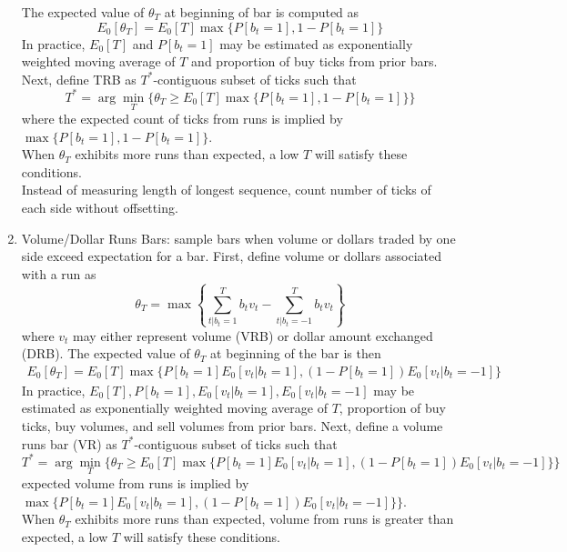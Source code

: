 \begin{remark}
\begin{enumerate}[label=\roman*.]
\begin{equation}
\end{equation}
The expected value of $\theta_T$ at beginning of bar is computed as
\begin{equation}
E_0[\theta_T] = E_0[T] \max \{P[b_t = 1], 1 - P[b_t = 1] \} \nonumber
\end{equation}
In practice, $E_0[T]$ and $P[b_t = 1]$ may be estimated as exponentially weighted moving average of $T$ and proportion of buy ticks from prior bars. Next, define TRB as $T^*$-contiguous subset of ticks such that
\begin{equation}
T^* = \arg \min_T \{ \theta_T \geq E_0[T] \max \{P[b_t = 1], 1 - P[b_t = 1] \} \} \nonumber
\end{equation}
where the expected count of ticks from runs is implied by $\max \{P[b_t = 1], 1 - P[b_t = 1] \}$.\\
When $\theta_T$ exhibits more runs than expected, a low $T$ will satisfy these conditions.\\
Instead of measuring length of longest sequence, count number of ticks of each side without offsetting.
\item Volume/Dollar Runs Bars: sample bars when volume or dollars traded by one side exceed expectation for a bar. First, define volume or dollars associated with a run as
\begin{equation}
\theta_T = \max \left\{ \sum\limits_{t \vert b_t = 1}^T b_t v_t - \sum\limits_{t \vert b_t = -1}^T b_t v_t \right\} \nonumber
\end{equation}
where $v_t$ may either represent volume (VRB) or dollar amount exchanged (DRB). The expected value of $\theta_T$ at beginning of the bar is then
\begin{align}
E_0 [\theta_T] = E_0[T] \max \{ P[b_t = 1]E_0[v_t \vert b_t = 1], (1 - P[b_t = 1]) E_0[v_t \vert b_t = -1] \} \nonumber
\end{align}
In practice, $E_0[T], P[b_t = 1], E_0[v_t \vert b_t = 1], E_0[v_t \vert b_t = -1]$ may be estimated as exponentially weighted moving average of $T$, proportion of buy ticks, buy volumes, and sell volumes from prior bars. Next, define a volume runs bar (VR) as $T^*$-contiguous subset of ticks such that
\begin{equation}
T^* = \arg \min_T \{ \theta_T \geq E_0[T] \max \{P[b_t = 1]E_0[v_t \vert b_t = 1], (1 - P[b_t = 1]) E_0[v_t \vert b_t = -1] \} \} \nonumber
\end{equation}
expected volume from runs is implied by $\max \{P[b_t = 1]E_0[v_t \vert b_t = 1], (1 - P[b_t = 1]) E_0[v_t \vert b_t = -1] \} \}$.\\
When $\theta_T$ exhibits more runs than expected, volume from runs is greater than expected, a low $T$ will satisfy these conditions.
\end{enumerate}
\end{remark}

